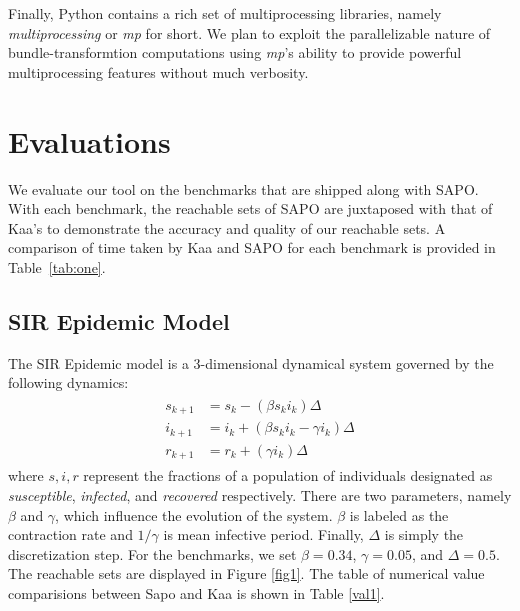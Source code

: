 \documentclass[EPiC]{easychair}
\begin{document}
%
Finally, Python contains a rich set of multiprocessing libraries, namely \emph{multiprocessing} or \emph{mp} for short. We plan to exploit the parallelizable nature of bundle-transformtion computations using \emph{mp}'s ability to provide powerful multiprocessing features without much verbosity.






\section{Evaluations}
We evaluate our tool on the benchmarks that are shipped along with SAPO. With each benchmark, the reachable sets of SAPO are juxtaposed with that of Kaa's to demonstrate the accuracy and quality of our reachable sets. A comparison of time taken by Kaa and SAPO for each benchmark is provided in Table~\ref{tab:one}.

\subsection{SIR Epidemic Model}
\noindent The SIR Epidemic model is a 3-dimensional dynamical system governed by the following dynamics:
\begin{align} \label{eqn:sir}
    \begin{split}
        s_{k+1} &= s_k - (\beta s_k i_k)\Delta \\
        i_{k+1} &= i_k + (\beta s_k i_k - \gamma i_k)\Delta \\
        r_{k+1} &= r_k + (\gamma i_k)\Delta
    \end{split}
\end{align} 
where $s,i,r$ represent the fractions of a population of individuals designated as \textit{susceptible}, \textit{infected}, and \textit{recovered} respectively. There are two parameters, namely $\beta$ and $\gamma$, which influence the evolution of the system. $\beta$ is labeled as the contraction rate and $1/\gamma$ is mean infective period. Finally, $\Delta$ is simply the discretization step. For the benchmarks, we set $\beta = 0.34$, $\gamma=0.05$, and $\Delta=0.5$. The reachable sets are displayed in Figure \ref{fig1}. The table of numerical value comparisions between Sapo and Kaa is shown in Table \ref{val1}.
\end{document}
